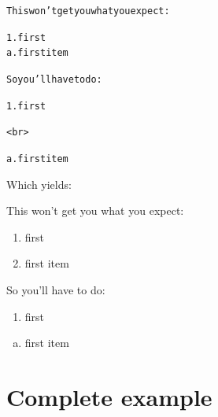 \documentclass[DIV=12,%
               BCOR=0mm,%
               fontsize=10pt,%
               oneside,%
               paper=210mm:11in]{scrbook}
\newcommand*{\hairline}{%
  \bigskip%
  \noindent \hrulefill%
  \bigskip%
}
\begin{document}
\begin{alltt}
This won't get you what you expect:

 1. first
 a. first item

So you'll have to do:

 1. first

<br>

 a. first item

\end{alltt}


Which yields:


\hairline


This won't get you what you expect:


\begin{enumerate}[1.]
\item\relax 
first



\item\relax 
first item




\end{enumerate}

So you'll have to do:


\begin{enumerate}[1.]
\item\relax 
first




\end{enumerate}


\bigskip


\begin{enumerate}[a.]
\item\relax 
first item




\end{enumerate}

\hairline

\section{Complete example}
\end{document}
